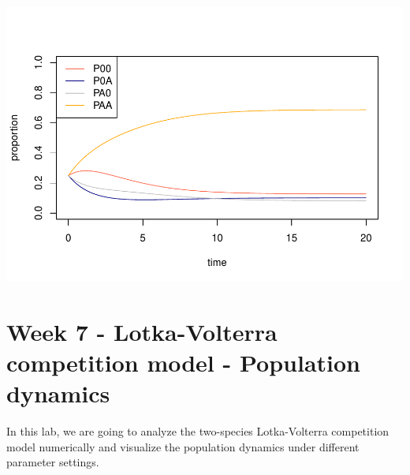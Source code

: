 \documentclass[
]{book}
\begin{document}
\includegraphics{bookdown-demo_files/figure-latex/unnamed-chunk-20-2.pdf}

\hypertarget{week-7---lotka-volterra-competition-model---population-dynamics}{%
\chapter*{Week 7 - Lotka-Volterra competition model - Population dynamics}\label{week-7---lotka-volterra-competition-model---population-dynamics}}

In this lab, we are going to analyze the two-species Lotka-Volterra competition model numerically and visualize the population dynamics under different parameter settings.
\end{document}
